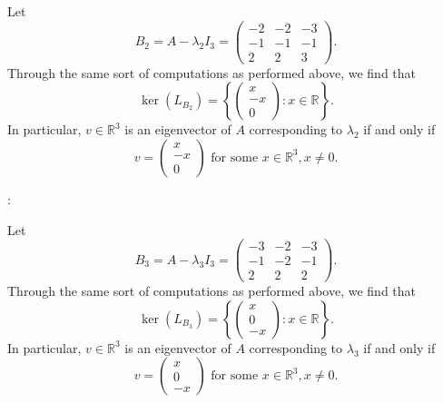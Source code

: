 \documentclass[12pt]{article}
\begin{document}
\begin{enumerate}
\begin{enumerate}
\begin{enumerate}[label=(\roman*)]
Let
\begin{equation*}
B_2 = A - \lambda_2 I_3
= \begin{pmatrix}
-2 & -2 & -3 \\
-1 & -1 & -1 \\
2 & 2 & 3
\end{pmatrix}.
\end{equation*}
Through the same sort of computations as performed above, we find that
\begin{equation*}
\ker(L_{B_2}) = \left\{
\begin{pmatrix}
x \\
-x \\
0
\end{pmatrix} : x \in \mathbb{R}
\right\}.
\end{equation*}
In particular, $v \in \mathbb{R}^3$ is an eigenvector of $A$ corresponding to $\lambda_2$ if and only if
\begin{equation*}
v = \begin{pmatrix}
x \\
-x \\
0
\end{pmatrix} \text{ for some } x \in \mathbb{R}^3, x \neq 0.
\end{equation*}

:

Let
\begin{equation*}
B_3 = A - \lambda_3 I_3
= \begin{pmatrix}
-3 & -2 & -3 \\
-1 & -2 & -1 \\
2 & 2 & 2
\end{pmatrix}.
\end{equation*}
Through the same sort of computations as performed above, we find that
\begin{equation*}
\ker(L_{B_3}) = \left\{
\begin{pmatrix}
x \\
0 \\
-x
\end{pmatrix} : x \in \mathbb{R}
\right\}.
\end{equation*}
In particular, $v \in \mathbb{R}^3$ is an eigenvector of $A$ corresponding to $\lambda_3$ if and only if
\begin{equation*}
v = \begin{pmatrix}
x \\
0 \\
-x
\end{pmatrix} \text{ for some } x \in \mathbb{R}^3, x \neq 0.
\end{equation*}


\end{enumerate}
\end{enumerate}
\end{enumerate}
\end{document}
